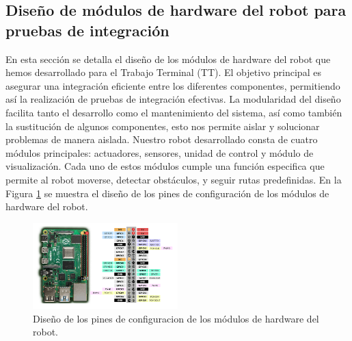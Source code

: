 \subsection{Dise\~no de m\'odulos de hardware del robot para pruebas de integraci\'on}
    En esta secci\'on se detalla el dise\~no de los m\'odulos de hardware del robot que hemos
        desarrollado para el Trabajo Terminal (TT). El objetivo principal es asegurar una integraci\'on
        eficiente entre los diferentes componentes, permitiendo as\'i la realizaci\'on de pruebas
        de integraci\'on efectivas. La modularidad del dise\~no facilita tanto el desarrollo como el
        mantenimiento del sistema, as\'i como tambi\'en la sustituci\'on de algunos componentes,
        esto nos permite aislar y solucionar problemas de manera aislada.
    \vskip 0.5cm
    Nuestro robot desarrollado consta de cuatro m\'odulos principales: actuadores,
        sensores, unidad de control y m\'odulo de visualizaci\'on. Cada uno de estos m\'odulos
        cumple una funci\'on especifica que permite al robot moverse, detectar obst\'aculos, y
        seguir rutas predefinidas. En la Figura \ref{fig:robot} se muestra el dise\~no de los pines
        de configuraci\'on de los m\'odulos de hardware del robot.
    \vskip 0.5cm
    \begin{figure}[htbp]
        \centering
        \includegraphics[width=0.5\textwidth]{./images/Pruebas/robot/robot01.png}
        \caption{Dise\~no de los pines de configuracion de los m\'odulos de hardware del robot.}
        \label{fig:robot}
    \end{figure}

